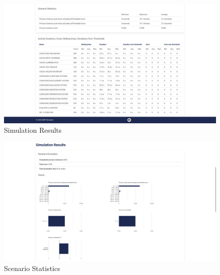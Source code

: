\begin{figure}[H]
    \centering
    \includegraphics[width=1\textwidth]{figures/Simulation Results.png}
    \caption{Simulation Results}
    \label{fig:simulation_results}
\end{figure}

\begin{figure}[H]
    \centering
    \includegraphics[width=1\textwidth]{figures/Scenario Statistics.png}
    \caption{Scenario Statistics}
    \label{fig:scenario_Statistics}
\end{figure}

